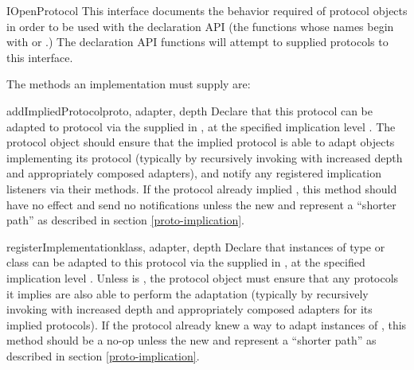 \begin{verbatim%
}
\begin{verbatim%
}
\begin{verbatim%
}
\begin{verbatim%
}
\begin{classdesc*}{IOpenProtocol}
This interface documents the behavior required of protocol objects in order to
be used with the  declaration API (the functions whose names
begin with  or .)  The declaration API functions
will attempt to  supplied protocols to this interface.

The methods an  implementation must supply are:


\begin{methoddesc}{addImpliedProtocol}{proto, adapter, depth}
Declare that this protocol can be adapted to protocol  via the
 supplied in , at the specified implication
level .  The protocol object should ensure that the implied protocol
is able to adapt objects implementing its protocol (typically by recursively
invoking  with increased depth and
appropriately composed adapters), and notify any registered implication
listeners via their  methods.  If the protocol
already implied , this method should have no effect and send no
notifications unless the new  and  represent a
``shorter path'' as described in section \ref{proto-implication}.
\end{methoddesc}


\begin{methoddesc}{registerImplementation}{klass, adapter, depth}
Declare that instances of type or class  can be adapted to this
protocol via the  supplied in , at the
specified implication level .  Unless  is
, the protocol object must ensure that
any protocols it implies are also able to perform the adaptation (typically
by recursively invoking  with increased depth
and appropriately composed adapters for its implied protocols).  If the
protocol already knew a way to adapt instances of , this method
should be a no-op unless the new  and  represent a
``shorter path'' as described in section \ref{proto-implication}.
\end{methoddesc}







\end{classdesc*}
\end{verbatim%
}
\end{verbatim%
}
\end{verbatim%
}
\end{verbatim%
}
